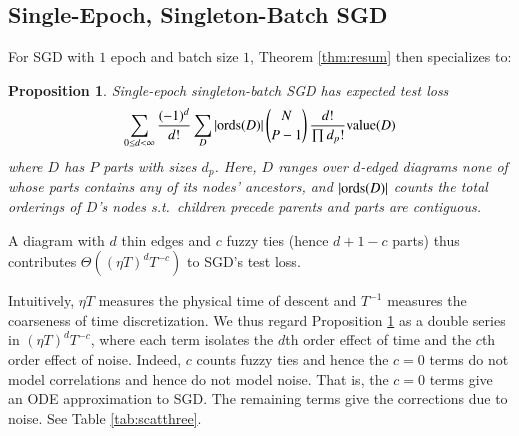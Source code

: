 \documentclass{article}
\theoremstyle{plain}
\newtheorem{prop}{Proposition}
\theoremstyle{definition}
\newcommand{\wrap}[1]{\left(#1\right)}
\newcommand{\dvalue}{\text{\textnormal{value}}}
\newcommand{\ords}{\text{\textnormal{ords}}}
\begin{document}
    \subsection{Single-Epoch, Singleton-Batch SGD}
        For SGD with $1$ epoch and batch size $1$, Theorem \ref{thm:resum} then
        specializes to: 
        \begin{prop} \label{prop:vanilla}
            Single-epoch singleton-batch SGD has expected test loss
            \begin{equation*}\label{eq:sgdbasiccoef}
                \sum_{0\leq d<\infty}
                \frac{(-1)^d}{d!} \sum_{D} 
                |\ords(D)| \, {N \choose P-1} \, \frac{d!}{\prod d_p!}
                \dvalue(D)
            \end{equation*}
            where $D$ has $P$ parts with sizes $d_p$.
            Here, $D$ ranges over $d$-edged diagrams none of whose parts
            contains any of its nodes' ancestors, and
            $|\ords(D)|$ counts the total orderings of $D$'s nodes s.t.\
            children precede parents and parts are contiguous.
        \end{prop}
        A diagram with $d$ thin edges and $c$ fuzzy ties (hence $d+1-c$
        parts) thus contributes $\Theta\wrap{(\eta T)^d T^{-c}}$ to SGD's test
        loss. 

        Intuitively, $\eta T$ measures the physical time of descent and
        $T^{-1}$ measures the coarseness of time discretization.  We thus
        regard Proposition \ref{prop:vanilla} as a double series in $(\eta T)^d
        T^{-c}$, where each term isolates the $d$th order effect of time and
        the $c$th order effect of noise.  Indeed, $c$ counts fuzzy ties and
        hence the $c=0$ terms do not model correlations and hence do not model
        noise.  That is, the $c=0$ terms give an ODE approximation to SGD.  The
        remaining terms give the corrections due to noise.  See Table
        \ref{tab:scatthree}. 
\end{document}
